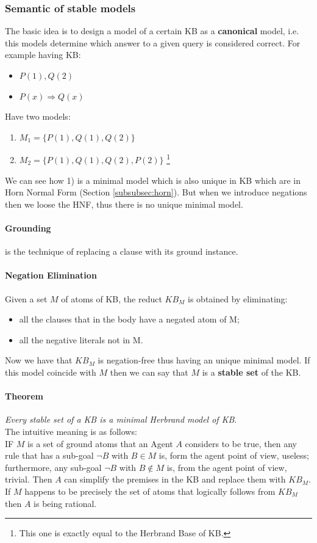 \documentclass[10pt,a4paper]{article}
\begin{document}
\subsubsection{Semantic of stable models}
The basic idea is to design a model of a certain KB as a \textbf{canonical} model, i.e. this models determine which answer to a given query is considered correct. For example having KB:
\begin{itemize}
\item $P(1),Q(2)$
\item $P(x) \Rightarrow Q(x)$
\end{itemize}
Have two models:
\begin{enumerate}
\item $M_1=\lbrace P(1), Q(1), Q(2) \rbrace$
\item $M_2=\lbrace P(1), Q(1), Q(2), P(2)\rbrace$ \footnote{This one is exactly equal to the Herbrand Base of KB.}
\end{enumerate}
We can see how 1) is a minimal model which is also unique in KB which are in Horn Normal Form (Section \ref{subsubsec:horn}). But when we introduce negations then we loose the HNF, thus there is no unique minimal model.\\

\paragraph{Grounding} is the technique of replacing a clause with its ground instance.

\paragraph{Negation Elimination} Given a set $M$ of atoms of KB, the reduct $KB_M$ is obtained by eliminating:
\begin{itemize}
\item all the clauses that in the body have a negated atom of M;
\item all the negative literals not in M.
\end{itemize}
Now we have that $KB_M$ is negation-free thus having an unique minimal model. If this model coincide with $M$ then we can say that $M$ is a \textbf{stable set} of the KB.\\

\paragraph{Theorem}
\textit{Every stable set of a KB is a minimal Herbrand model of KB}.\\
The intuitive meaning is as follows:\\
IF $M$ is a set of ground atoms that an Agent $A$ considers to be true, then any rule that has a sub-goal $\neg B$ with $B \in M$ is, form the agent point of view, useless; furthermore, any sub-goal $\neg B$ with $B \notin M$ is, from the agent point of view, trivial. Then $A$ can simplify the premises in the KB and replace them with $KB_M$. If $M$ happens to be precisely the set of atoms that logically follows from $KB_M$ then $A$ is being rational.\\
\end{document}

